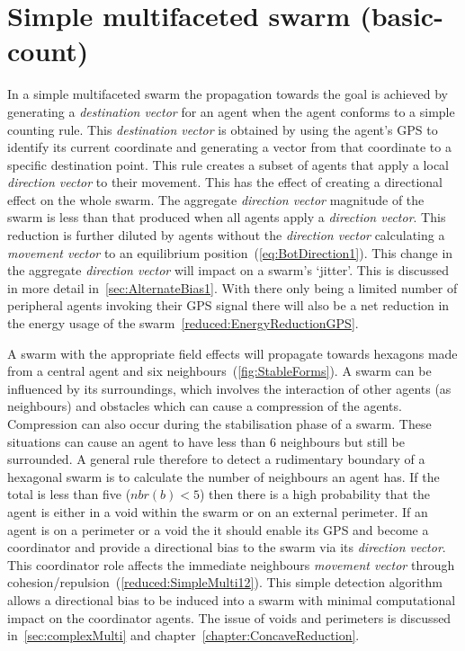 \section{Simple multifaceted swarm (basic-count)} 
In a simple multifaceted swarm the propagation towards the goal is achieved by generating a \textit{destination vector} for an agent when the agent conforms to a simple counting rule. This \textit{destination vector} is obtained by using the agent's GPS to identify its current coordinate and generating a vector from that coordinate to a specific destination point. This rule creates a subset of agents that apply a local \textit{direction vector} to their movement. This has the effect of creating a directional effect on the whole swarm. The aggregate \textit{direction vector} magnitude of the swarm is less than that produced when all agents apply a \textit{direction vector}. This reduction is further diluted by agents without the \textit{direction vector} calculating a \textit{movement vector} to an equilibrium position~(\autoref{eq:BotDirection1}). This change in the aggregate \textit{direction vector} will impact on a swarm's `jitter'. This is discussed in more detail in~\autoref{sec:AlternateBias1}. With there only being a limited number of peripheral agents invoking their GPS signal there will also be a net reduction in the energy usage of the swarm~\autoref{reduced:EnergyReductionGPS}.

A swarm with the appropriate field effects will propagate towards hexagons made from a central agent and six neighbours~(\autoref{fig:StableForms}). A swarm can be influenced by its surroundings, which involves the interaction of other agents (as neighbours) and obstacles which can cause a compression of the agents. Compression can also occur during the stabilisation phase of a swarm. These situations can cause an agent to have less than 6 neighbours but still be surrounded. A general rule therefore to detect a rudimentary boundary of a hexagonal swarm is to calculate the number of neighbours an agent has. If the total is less than five ($nbr(b) < 5$) then there is a high probability that the agent is either in a void within the swarm or on an external perimeter. If an agent is on a perimeter or a void the it should enable its GPS and become a coordinator and provide a directional bias to the swarm via its \textit{direction vector}. This coordinator role affects the immediate neighbours \textit{movement vector} through cohesion/repulsion~(\autoref{reduced:SimpleMulti12}). This simple detection algorithm allows a directional bias to be induced into a swarm with minimal computational impact on the coordinator agents. The issue of voids and perimeters is discussed in~\autoref{sec:complexMulti} and chapter~\ref{chapter:ConcaveReduction}.

